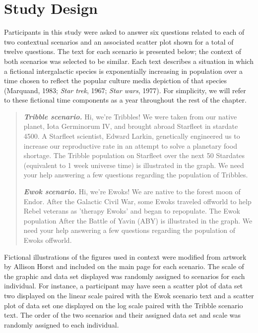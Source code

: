 \documentclass[print]{nuthesis}
\begin{document}
\hypertarget{study-design-2}{%
\section{Study Design}\label{study-design-2}}

Participants in this study were asked to answer six questions related to each of two contextual scenarios and an associated scatter plot shown for a total of twelve questions.
The text for each scenario is presented below; the context of both scenarios was selected to be similar.
Each text describes a situation in which a fictional intergalactic species is exponentially increasing in population over a time chosen to reflect the popular culture media depiction of that species (Marquand, 1983; \emph{Star trek}, 1967; \emph{Star wars}, 1977).
For simplicity, we will refer to these fictional time components as a year throughout the rest of the chapter.

\begin{quote}
\textbf{\textit{Tribble scenario.}} Hi, we're Tribbles! We were taken from our native planet, Iota Germinorum IV, and brought abroad Starfleet in stardate 4500. A Starfleet scientist, Edward Larkin, genetically engineered us to increase our reproductive rate in an attempt to solve a planetary food shortage. The Tribble population on Starfleet over the next 50 Stardates (equivalent to 1 week universe time) is illustrated in the graph. We need your help answering a few questions regarding the population of Tribbles.

\textbf{\textit{Ewok scenario.}} Hi, we're Ewoks! We are native to the forest moon of Endor. After the Galactic Civil War, some Ewoks traveled offworld to help Rebel veterans as 'therapy Ewoks' and began to repopulate. The Ewok population After the Battle of Yavin (ABY) is illustrated in the graph. We need your help answering a few questions regarding the population of Ewoks offworld.
\end{quote}

Fictional illustrations of the figures used in context were modified from artwork by Allison Horst and included on the main page for each scenario.
The scale of the graphic and data set displayed was randomly assigned to scenarios for each individual.
For instance, a participant may have seen a scatter plot of data set two displayed on the linear scale paired with the Ewok scenario text and a scatter plot of data set one displayed on the log scale paired with the Tribble scenario text.
The order of the two scenarios and their assigned data set and scale was randomly assigned to each individual.
\end{document}
